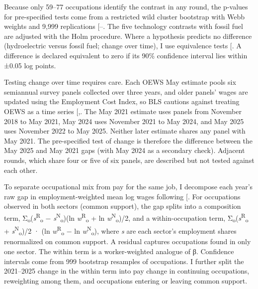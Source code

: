 \documentclass[
  11pt,
]{article}
\begin{document}
Because only 59--77 occupations identify the contrast in any round, the
p-values for pre-specified tests come from a restricted wild cluster
bootstrap with Webb weights and 9,999 replications
{[}--\citeproc{ref-webb2023reworking}{47}{]}.
The five technology contrasts with fossil fuel are adjusted with the
Holm procedure. Where a hypothesis predicts no difference (hydroelectric
versus fossil fuel; change over time), I use equivalence tests
{[}\citeproc{ref-lakens2017equivalence}{48}{]}. A difference is declared
equivalent to zero if its 90\% confidence interval lies within ±0.05 log
points.

Testing change over time requires care. Each OEWS May estimate pools six
semiannual survey panels collected over three years, and older panels'
wages are updated using the Employment Cost Index, so BLS cautions
against treating OEWS as a time series
{[},\citeproc{ref-bls2025oewsfaq}{50}{]}.
The May 2021 estimate uses panels from November 2018 to May 2021, May
2024 uses November 2021 to May 2024, and May 2025 uses November 2022 to
May 2025. Neither later estimate shares any panel with May 2021. The
pre-specified test of change is therefore the difference between the May
2025 and May 2021 gaps (with May 2024 as a secondary check). Adjacent
rounds, which share four or five of six panels, are described but not
tested against each other.

To separate occupational mix from pay for the same job, I decompose each
year's raw gap in employment-weighted mean log wages following
{[}\citeproc{ref-kitagawa1955components}{51}{]}. For occupations
observed in both sectors (common support), the gap splits into a
composition term,
Σ\textsubscript{o}(\emph{s}\textsuperscript{R}\textsubscript{o} −
\emph{s}\textsuperscript{N}\textsubscript{o})(ln
\emph{w}\textsuperscript{R}\textsubscript{o} + ln
\emph{w}\textsuperscript{N}\textsubscript{o})/2, and a within-occupation
term, Σ\textsubscript{o}(\emph{s}\textsuperscript{R}\textsubscript{o} +
\emph{s}\textsuperscript{N}\textsubscript{o})/2 · (ln
\emph{w}\textsuperscript{R}\textsubscript{o} − ln
\emph{w}\textsuperscript{N}\textsubscript{o}), where \emph{s} are each
sector's employment shares renormalized on common support. A residual
captures occupations found in only one sector. The within term is a
worker-weighted analogue of β. Confidence intervals come from 999
bootstrap resamples of occupations. I further split the 2021--2025
change in the within term into pay change in continuing occupations,
reweighting among them, and occupations entering or leaving common
support.
\end{document}
